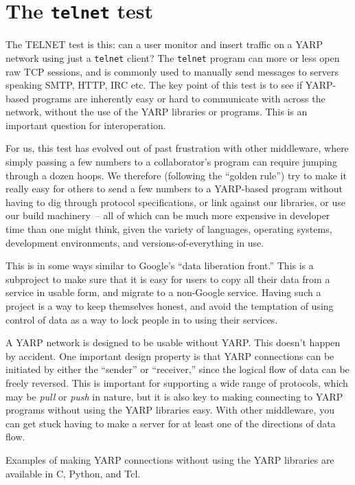 \documentclass[letterpaper]{article}
\begin{document}
\section{The {\tt telnet} test}

The TELNET test is this: can a user monitor and insert traffic on a
YARP network using just a {\tt telnet} client?  The {\tt telnet}
program can more or less open raw TCP sessions, and is commonly used
to manually send messages to servers speaking SMTP, HTTP, IRC etc.
The key point of this test is to see if YARP-based programs are
inherently easy or hard to communicate with across the network,
without the use of the YARP libraries or programs.  This is an
important question for interoperation.

For us, this test has evolved out of past frustration with other
middleware, where simply passing a few numbers to a collaborator's
program can require jumping through a dozen hoops.  We therefore
(following the ``golden rule'') try to make it really easy for others
to send a few numbers to a YARP-based program without having to dig
through protocol specifications, or link against our libraries, or use
our build machinery~-- all of which can be much more expensive in
developer time than one might think, given the variety of languages,
operating systems, development environments, and
versions-of-everything in use.

This is in some ways similar to Google's ``data liberation front.''
This is a subproject to make sure that it is easy for users to copy
all their data from a service in usable form, and migrate to a
non-Google service.  Having such 
a project is a way to keep themselves honest, and avoid the 
temptation of using control of data as a way to lock people in to
using their services.

A YARP network is designed to be usable without YARP.  This doesn't
happen by accident.  
One important design property is that YARP
connections can be initiated by either the ``sender'' or ``receiver,''
since the logical flow of data can be freely reversed.  This is
important for supporting a wide range of protocols, which may be {\it
  pull} or {\it push} in nature, but it is also key to making
connecting to YARP programs without using the YARP libraries easy.
With other middleware, you can get stuck having to make a server for
at least one of the directions of data flow.

Examples of making YARP connections without using the YARP libraries are
available in C, Python, and Tcl.
\end{document}
